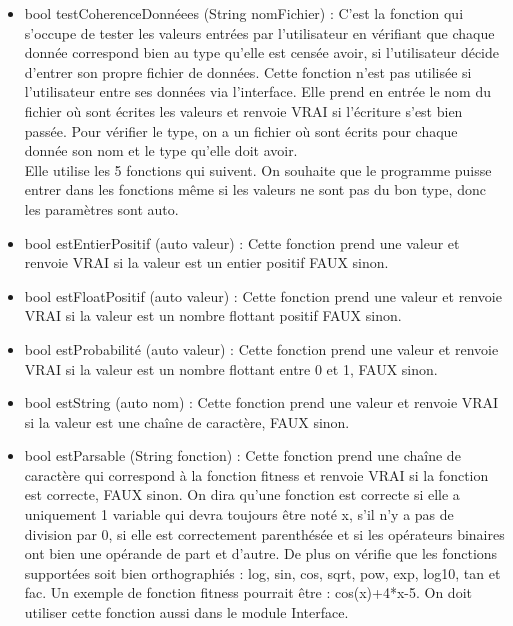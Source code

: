 \documentclass[a4paper,11pt]{article}
\begin{document}
			\begin{itemize}
				\item bool testCoherenceDonnéees (String nomFichier) : C’est la fonction qui s’occupe de tester les valeurs entrées par l’utilisateur en vérifiant que chaque donnée correspond bien au type qu’elle est censée avoir, si l'utilisateur décide d'entrer son propre fichier de données. Cette fonction n'est pas utilisée si l'utilisateur entre ses données via l'interface.
					Elle prend en entrée le nom du fichier où sont écrites les valeurs et renvoie VRAI si l'écriture s'est bien passée.
					Pour vérifier le type, on a un fichier où sont écrits pour chaque donnée son nom et le type qu’elle doit avoir.\\
					Elle utilise les 5 fonctions qui suivent. On souhaite que le programme puisse entrer dans les fonctions même si les valeurs ne sont pas du bon type, donc les paramètres sont auto.\vspace{0.2cm}
				\item bool estEntierPositif (auto valeur) : Cette fonction prend une valeur et renvoie VRAI si la valeur est un entier positif FAUX sinon.\vspace{0.2cm}
				\item bool estFloatPositif (auto valeur) : Cette fonction prend une valeur et renvoie VRAI si la valeur est un nombre flottant positif FAUX sinon.\vspace{0.2cm}
				\item bool estProbabilité (auto valeur) : Cette fonction prend une valeur et renvoie VRAI si la valeur est un nombre flottant entre 0 et 1, FAUX sinon.\vspace{0.2cm}
				\item bool estString (auto nom) : 	Cette fonction prend une valeur et renvoie VRAI si la valeur est une chaîne de caractère, FAUX sinon.\vspace{0.2cm}
				\item bool estParsable (String fonction) : Cette fonction prend une chaîne de caractère qui correspond à la fonction fitness et renvoie VRAI si la fonction est correcte, FAUX sinon. On dira qu’une fonction est correcte si elle a uniquement 1 variable qui devra toujours être noté x, s’il n’y a pas de division par 0, si elle est correctement parenthésée et si les opérateurs binaires ont bien une opérande de part et d’autre. De plus on vérifie que les fonctions supportées soit bien orthographiés : log, sin, cos, sqrt, pow, exp, log10, tan et fac.  Un exemple de fonction fitness pourrait être : cos(x)+4*x-5. On doit utiliser cette fonction aussi dans le module Interface.\\
			\end{itemize}
			
\end{document}

